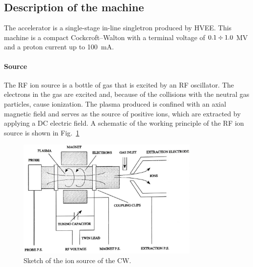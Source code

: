 \begin{refsection}
    \subsection{Description of the machine}
        \label{sec:cw:machine}
        The accelerator is a single-stage in-line singletron produced by HVEE. 
        This machine is a compact Cockcroft–Walton with a terminal voltage of $0.1\divisionsymbol1.0$ MV and a proton current up to \SI{100}{mA}.
        
        \paragraph{Source} The RF ion source is a bottle of gas that is excited by an RF oscillator. 
        The electrons in the gas are excited and, because of the collisions with the neutral gas particles, cause ionization.
        The plasma produced is confined with an axial magnetic field and serves as the source of positive ions, which are extracted by applying a DC electric field.
        A schematic of the working principle of the RF ion source is shown in Fig.~\ref{fig:CW:sketch:ionsource}

       \begin{figure}
            \centering
            \includegraphics[width=0.8\textwidth]{Figures/MEG/CW/cw_ionsource.jpeg}
            \caption[CW: source]{Sketch of the ion source of the CW.}
            \label{fig:CW:sketch:ionsource}
        \end{figure}
        

\end{refsection}

